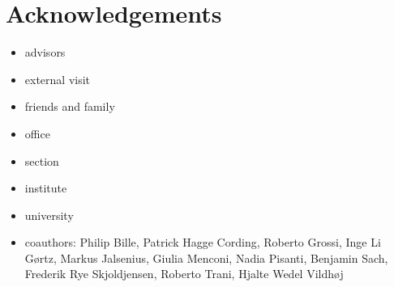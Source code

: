 


\section{Acknowledgements}

\begin{itemize}
    \item advisors
    \item external visit
    \item friends and family
    \item office
    \item section
    \item institute
    \item university
    \item coauthors: Philip Bille, Patrick Hagge Cording, Roberto Grossi, Inge Li Gørtz, Markus Jalsenius, Giulia Menconi, Nadia Pisanti, Benjamin Sach, Frederik Rye Skjoldjensen, Roberto Trani, Hjalte Wedel Vildhøj
\end{itemize}

 

